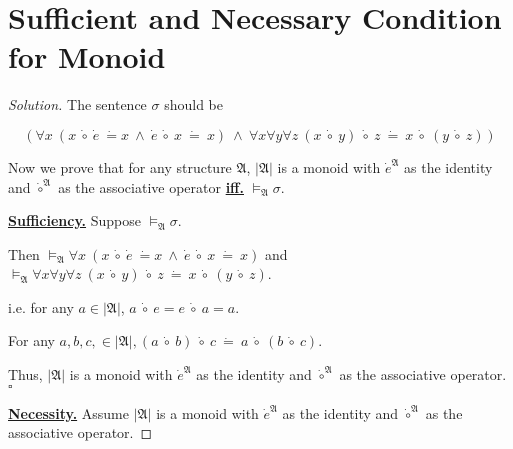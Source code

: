 \documentclass{article}
\newenvironment{solution}{\begin{proof}[\noindent\it Solution]}{\end{proof}}
\newcommand{\whiteqed}{\hfill $\square$\par}
\begin{document}
\vspace{1em}
\section{Sufficient and Necessary Condition for Monoid}
\vspace{1em}
\begin{solution}
    The sentence $\sigma$ should be

    \vspace{-1.5em}
    $$\left(\forall x\ (x\ \dot{\circ}\ \dot{e}\ \dot{=}x\ \land\ \dot{e}\ \dot{\circ}\ x\ \dot{=}\ x)\ \land\ \forall x\forall y\forall z\ \left(x\ \dot{\circ}\ y\right)\ \dot{\circ}\  z\ \dot{=}\ x\ \dot{\circ}\ \left(y\  \dot{\circ}\ z\right)\right)$$

    \vspace{0.5em} \hspace{2.6em}
    Now we prove that for any structure $\mathfrak{A}$, $|\mathfrak{A}|$ is a monoid with $\dot{e}^{\mathfrak{A}}$ as the identity and $\dot{\circ}^{\mathfrak{A}}$ as the associative operator \underline{\textbf{iff.}} $\vDash_\mathfrak{A}\sigma$.

    \hspace{2.6em}
    \underline{\textbf{Sufficiency.}} Suppose $\vDash_\mathfrak{A}\sigma$. 

    \hspace{8.5em}
    Then $\vDash_\mathfrak{A}\forall x\ (x\ \dot{\circ}\ \dot{e}\ \dot{=}x\ \land\ \dot{e}\ \dot{\circ}\ x\ \dot{=}\ x)$ and $
    \vDash_\mathfrak{A}\forall x\forall y\forall z\ \left(x\ \dot{\circ}\ y\right)\ \dot{\circ}\  z\ \dot{=}\ x\ \dot{\circ}\ \left(y\  \dot{\circ}\ z\right) $.

    \hspace{8.5em}
    i.e. for any $a\in|\mathfrak{A}|$, $a\ \dot{\circ}\ e = e\ \dot{\circ}\ a = a.$ 
    
    \hspace{10.2em}
    For any $a,b,c,\in|\mathfrak{A}|, \left(a\ \dot{\circ}\ b\right)\ \dot{\circ}\  c\ \dot{=}\ a\ \dot{\circ}\ \left(b\  \dot{\circ}\ c\right)$.

    \hspace{2.6em}
    Thus, $|\mathfrak{A}|$ is a monoid with $\dot{e}^{\mathfrak{A}}$ as the identity and $\dot{\circ}^{\mathfrak{A}}$ as the associative operator. \whiteqed

    \vspace{1em} \hspace{2.6em}
    \underline{\textbf{Necessity.}} Assume $|\mathfrak{A}|$ is a monoid with $\dot{e}^{\mathfrak{A}}$ as the identity and $\dot{\circ}^{\mathfrak{A}}$ as the associative operator.


\end{solution}
\end{document}
